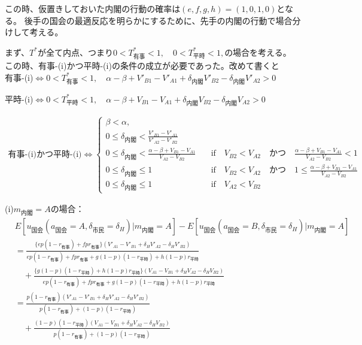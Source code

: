 \documentclass[main.tex]{subfiles}
\begin{document}
この時、仮置きしておいた内閣の行動の確率は$(e,f,g,h) = (1,0,1,0)$となる。
後手の国会の最適反応を明らかにするために、先手の内閣の行動で場合分けして考える。

\bigskip
まず、$T^*$が全て内点、つまり$0<T^*_{有事}<1,\quad 0<T^*_{平時}<1,$の場合を考える。\\
この時、有事-(i)かつ平時-(i)の条件の成立が必要であった。改めて書くと\\

有事-(i)$\Leftrightarrow 0<T^*_{有事}<1,\quad \alpha-\beta + V'_{B1}-V'_{A1} + \delta_{内閣}V'_{B2} - \delta_{内閣}V'_{A2} > 0$

平時-(i)$\Leftrightarrow 0<T^*_{平時}<1,\quad \alpha-\beta + V_{B1}-V_{A1} + \delta_{内閣}V_{B2} - \delta_{内閣}V_{A2} > 0$

\begin{align*}
    \text{有事-(i)かつ平時-(i)} \Leftrightarrow 
    \begin{cases}
        \beta < \alpha, \\
        0 \le \delta_{内閣} < \frac{V'_{B1}-V'_{A1}}{V'_{A2} - V'_{B2}}\\
        0 \le \delta_{内閣} < \frac{\alpha-\beta + V_{B1}-V_{A1}}{V_{A2} - V_{B2}} \quad&\text{if}\quad V_{B2} < V_{A2} \quad{かつ}\quad \frac{\alpha-\beta + V_{B1}-V_{A1}}{V_{A2} - V_{B2}}<1\\
        0 \le \delta_{内閣} \le 1 \quad&\text{if}\quad V_{B2} < V_{A2} \quad{かつ}\quad 1 \le \frac{\alpha-\beta + V_{B1}-V_{A1}}{V_{A2} - V_{B2}}\\
        0 \le \delta_{内閣} \le 1 \quad&\text{if}\quad V_{A2} < V_{B2}
    \end{cases}
\end{align*}


(i)$m_{内閣}=A$の場合：
\begin{align*}
    & E[u_{国会}(a_{国会}=A, \delta_{市民}=\delta_H) | m_{内閣} = A  ] - E[u_{国会}(a_{国会}=B, \delta_{市民}=\delta_H) | m_{内閣} = A  ]\\[1em]
    &= \frac{ \{ep(1-r_{有事}) +  fpr_{有事}\}(V'_{A1} -V'_{B1} + \delta_H V'_{A2} - \delta_H V'_{B2})  }{ ep(1-r_{有事}) + fpr_{有事} + g(1-p)(1-r_{平時}) + h(1-p)r_{平時} }\\[1em]
    &\quad + \frac{ \{g(1-p)(1-r_{平時}) + h(1-p)r_{平時}\}(V_{A1} - V_{B1} + \delta_H V_{A2} - \delta_H V_{B2} ) }{ ep(1-r_{有事}) + fpr_{有事} + g(1-p)(1-r_{平時}) + h(1-p)r_{平時} }\\[1em]
    &= \frac{ p(1-r_{有事}) (V'_{A1} -V'_{B1} + \delta_H V'_{A2} - \delta_H V'_{B2})  }{ p(1-r_{有事})  + (1-p)(1-r_{平時}) }\\[1em]
    &\quad + \frac{ (1-p)(1-r_{平時})(V_{A1} - V_{B1} + \delta_H V_{A2} - \delta_H V_{B2} ) }{ p(1-r_{有事}) +  (1-p)(1-r_{平時}) }
\end{align*}
\end{document}
